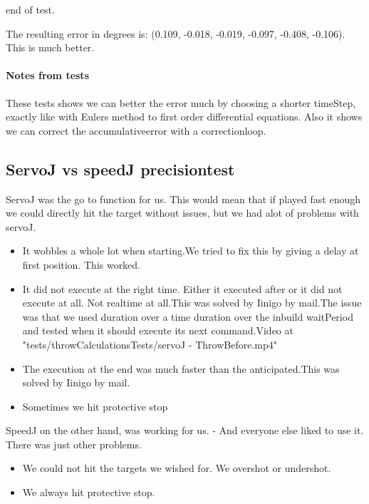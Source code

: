 end of test.\newline 

The resulting error in degrees is: (0.109, -0.018, -0.019, -0.097, -0.408, -0.106). This is much better.

\paragraph{Notes from tests}
These tests shows we can better the error much by choosing a shorter timeStep, exactly like with Eulers method to first order differential equations. 
Also it shows we can correct the accumulativeerror with a correctionloop.

\subsection{ServoJ vs speedJ precisiontest}

ServoJ was the go to function for us. This would mean that if played fast enough we could directly hit the target without issues, but we had alot of problems with servoJ.
\begin{itemize}
\item It wobbles a whole lot when starting.\linebreak We tried to fix this by giving a delay at first position. This worked.
\item It did not execute at the right time. Either it executed after or it did not execute at all. Not realtime at all.\linebreak This was solved by Iinigo by mail.\linebreak The issue was that we used duration over a time duration over the inbuild waitPeriod and tested when it should execute its next command.\linebreak Video at "tests/throwCalculationsTests/servoJ - ThrowBefore.mp4"
\item The execution at the end was much faster than the anticipated.\linebreak This was solved by Iinigo by mail.
\item Sometimes we hit protective stop
\end{itemize}

SpeedJ on the other hand, was working for us. - And everyone else liked to use it. There was just other problems.
\begin{itemize}
\item We could not hit the targets we wished for. We overshot or undershot.
\item We always hit protective stop.
\end{itemize}

